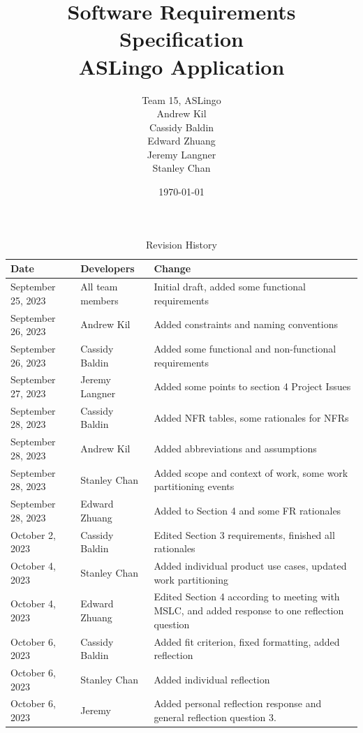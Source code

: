 \documentclass[12pt, titlepage]{article}
\title{Software Requirements Specification\\ASLingo Application}
\author{Team 15, ASLingo
		\\ Andrew Kil
		\\ Cassidy Baldin
		\\ Edward Zhuang
		\\ Jeremy Langner
		\\ Stanley Chan
}
\date{\today}
\begin{document}
\maketitle

\tableofcontents
\listoftables
\listoffigures

\begin{table}[H]
\caption{Revision History}
\begin{tabularx}{\textwidth}{|l|l|X|}
\hline {\bf Date} & {\bf Developers} & {\bf Change}\\
\hline
September 25, 2023 & All team members & Initial draft, added some functional requirements \\
September 26, 2023 & Andrew Kil & Added constraints and naming conventions \\
September 26, 2023 & Cassidy Baldin & Added some functional and non-functional requirements \\
September 27, 2023 & Jeremy Langner & Added some points to section 4 Project Issues \\
September 28, 2023 & Cassidy Baldin & Added NFR tables, some rationales for NFRs \\
September 28, 2023 & Andrew Kil & Added abbreviations and assumptions \\
September 28, 2023 & Stanley Chan & Added scope and context of work, some work partitioning events \\
September 28, 2023 & Edward Zhuang & Added to Section 4 and some FR rationales \\
October 2, 2023 & Cassidy Baldin & Edited Section 3 requirements, finished all rationales \\
October 4, 2023 & Stanley Chan & Added individual product use cases, updated work partitioning \\
October 4, 2023 & Edward Zhuang & Edited Section 4 according to meeting with MSLC, and added response to one reflection question \\
October 6, 2023 & Cassidy Baldin & Added fit criterion, fixed formatting, added reflection \\
October 6, 2023 & Stanley Chan & Added individual reflection \\
October 6, 2023 & Jeremy & Added personal reflection response and general reflection question 3.
\bottomrule
\end{tabularx}
\end{table}

\newpage

\end{document}
